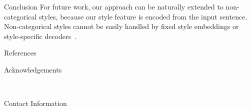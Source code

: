 \documentclass[final]{beamer}
\newlength{\onecolwid}
\begin{document}
\begin{frame}[t]
\begin{columns}[t]
\begin{column}{\onecolwid}
\begin{block}{Conclusion}
                For future work, our approach can be naturally extended to non-categorical styles, because our style feature is encoded from the input sentence. Non-categorical styles cannot be easily handled by fixed style embeddings \cite{shen2017style} or style-specific decoders~\cite{fu2018style}.
            \end{block}


            \begin{block}{References}

                \small{
                    \vspace{0.75in}}

            \end{block}



            \begin{block}{Acknowledgements}

                \small{} \\

            \end{block}



            \begin{alertblock}{Contact Information}


\end{alertblock}
\end{column}
\end{columns}
\end{frame}
\end{document}
